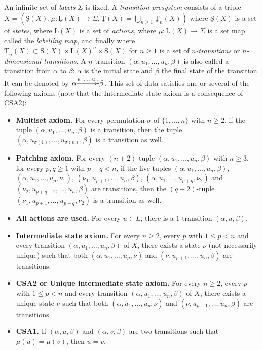 \documentclass[a4paper,12pt]{amsart}
\begin{document}
An infinite set of \emph{labels} $\Sigma$ is fixed. A \emph{transition
  presystem} consists of a triple $X=(\operatorname{\underline{S}}(X),\mu:\operatorname{\underline{L}}(X)\rightarrow
\Sigma,\operatorname{\underline{T}}(X)=\bigcup_{n{\geqslant} 1}\operatorname{\underline{T}}_n(X))$ where $\operatorname{\underline{S}}(X)$ is a set of
\emph{states}, where $\operatorname{\underline{L}}(X)$ is a set of \emph{actions}, where
$\mu:\operatorname{\underline{L}}(X)\rightarrow \Sigma$ is a set map called the \emph{labelling
  map}, and finally where $\operatorname{\underline{T}}_n(X)\subset \operatorname{\underline{S}}(X)\times \operatorname{\underline{L}}(X)^n\times \operatorname{\underline{S}}(X)$
for $n {\geqslant} 1$ is a set of \emph{$n$-transitions} or
\emph{$n$-dimensional transitions}. A $n$-transition
$(\alpha,u_1,\dots,u_n,\beta)$ is also called a {\rm transition from
  $\alpha$ to $\beta$}: $\alpha$ is the initial state and $\beta$ the
final state of the transition. It can be denoted by
$\xymatrix@1@C=3em{\alpha {\ar@{->}[r]^-{{u_1,\dots,u_n}}} & \beta}$.  This set of
data satisfies one or several of the following axioms (note that the
Intermediate state axiom is a consequence of CSA2):
\begin{itemize}
\item \textbf{Multiset axiom.} For every permutation $\sigma$ of
  $\{1,\dots,n\}$ with $n{\geqslant} 2$, if the tuple
  $(\alpha,u_1,\dots,u_n,\beta)$ is a transition, then the tuple
  $(\alpha,u_{\sigma(1)}, \dots, u_{\sigma(n)}, \beta)$ is a
  transition as well.
\item \textbf{Patching axiom.} For every $(n+2)$-tuple
  $(\alpha,u_1,\dots,u_n,\beta)$ with $n{\geqslant} 3$, for every $p,q{\geqslant} 1$
  with $p+q<n$, if the five tuples $(\alpha,u_1, \dots, u_n, \beta)$,
  $(\alpha,u_1, \dots, u_p, \nu_1)$, $(\nu_1, u_{p+1}, \dots, u_n,
  \beta)$, $(\alpha, u_1, \dots, u_{p+q}, \nu_2)$ and $(\nu_2,
  u_{p+q+1}, \dots, u_n, \beta)$ are transitions, then the
  $(q+2)$-tuple $(\nu_1, u_{p+1}, \dots, u_{p+q}, \nu_2)$ is a
  transition as well.
\item \textbf{All actions are used.} For every $u\in L$, there is a
  $1$-transition $(\alpha,u,\beta)$.
\item \textbf{Intermediate state axiom.} For every $n{\geqslant} 2$, every $p$ with
  $1{\leqslant} p<n$ and every transition $(\alpha,u_1,\dots,u_n,\beta)$ of
  $X$, there exists a state $\nu$ (not necessarily unique) such that
  both $(\alpha,u_1,\dots,u_p,\nu)$ and
  $(\nu,u_{p+1},\dots,u_n,\beta)$ are transitions.
\item \textbf{CSA2 or Unique intermediate state axiom.} For every $n{\geqslant} 2$,
  every $p$ with $1{\leqslant} p<n$ and every transition
  $(\alpha,u_1,\dots,u_n,\beta)$ of $X$, there exists a unique state
  $\nu$ such that both $(\alpha,u_1,\dots,u_p,\nu)$ and
  $(\nu,u_{p+1},\dots,u_n,\beta)$ are transitions.
\item \textbf{CSA1.}  If $(\alpha,u,\beta)$ and $(\alpha,v,\beta)$ are
  two transitions such that $\mu(u)=\mu(v)$, then $u=v$.
\end{itemize}
\end{document}
